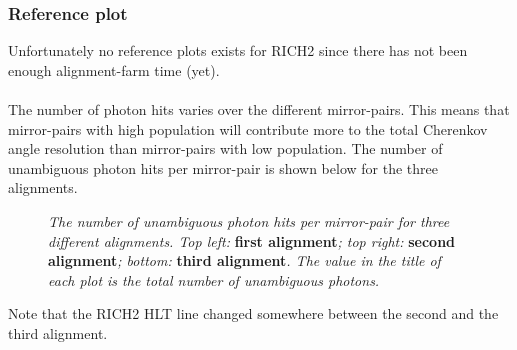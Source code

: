 \subsubsection{Reference plot}
Unfortunately no reference plots exists for RICH2 since there has not been enough alignment-farm time (yet).\\
\\
The number of photon hits varies over the different mirror-pairs. This means that mirror-pairs with high population will contribute more to the total Cherenkov angle resolution than mirror-pairs with low population. The number of unambiguous photon hits per mirror-pair is shown below for the three alignments.\\
\begin{figure}[!h]
	\vspace*{-0.cm}
	\begin{center}
		\vspace*{-0.5cm}
	\end{center}
	\caption{\textit{The number of unambiguous photon hits per mirror-pair for three different alignments. Top left:} \textbf{first alignment}\textit{; top right:} \textbf{second alignment}\textit{; bottom:} \textbf{third alignment}\textit{. The value in the title of each plot is the total number of unambiguous photons. } }
	\label{fig:rich2entries}
\end{figure}
Note that the RICH2 HLT line changed somewhere between the second and the third alignment.\\
\\


